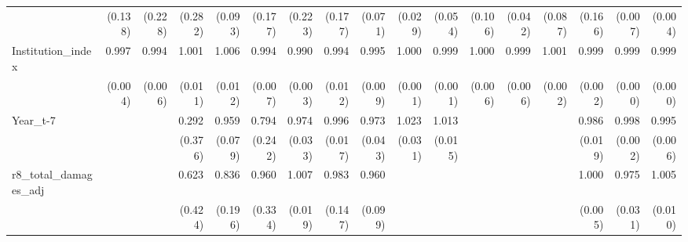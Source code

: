 \begin{table}[htbp]
\begin{tabular}{l*{16}{D{.}{.}{-1}}}
                    &     (0.138)         &     (0.228)         &     (0.282)         &     (0.093)         &     (0.177)         &     (0.223)         &     (0.177)         &     (0.071)         &     (0.029)         &     (0.054)         &     (0.106)         &     (0.042)         &     (0.087)         &     (0.166)         &     (0.007)         &     (0.004)         \\
Institution\_index   &       0.997         &       0.994         &       1.001         &       1.006         &       0.994         &       0.990\sym{***}&       0.994         &       0.995         &       1.000         &       0.999         &       1.000         &       0.999         &       1.001         &       0.999         &       0.999\sym{*}  &       0.999\sym{***}\\
                    &     (0.004)         &     (0.006)         &     (0.011)         &     (0.012)         &     (0.007)         &     (0.003)         &     (0.012)         &     (0.009)         &     (0.001)         &     (0.001)         &     (0.006)         &     (0.006)         &     (0.002)         &     (0.002)         &     (0.000)         &     (0.000)         \\
Year\_t-7            &                     &                     &       0.292         &       0.959         &       0.794         &       0.974         &       0.996         &       0.973         &       1.023         &       1.013         &                     &                     &                     &       0.986         &       0.998         &       0.995         \\
                    &                     &                     &     (0.376)         &     (0.079)         &     (0.242)         &     (0.033)         &     (0.017)         &     (0.043)         &     (0.031)         &     (0.015)         &                     &                     &                     &     (0.019)         &     (0.002)         &     (0.006)         \\
r8\_total\_damages\_adj&                     &                     &       0.623         &       0.836         &       0.960         &       1.007         &       0.983         &       0.960         &                     &                     &                     &                     &                     &       1.000         &       0.975         &       1.005         \\
                    &                     &                     &     (0.424)         &     (0.196)         &     (0.334)         &     (0.019)         &     (0.147)         &     (0.099)         &                     &                     &                     &                     &                     &     (0.005)         &     (0.031)         &     (0.010)         \\

\end{tabular}
\end{table}
